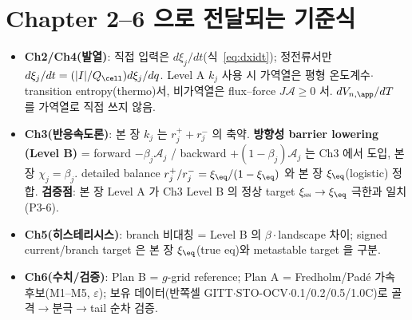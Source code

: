 \section{Chapter 2--6 으로 전달되는 기준식}\label{sec:transmit}
\begin{itemize}[leftmargin=1.4em]
\item \textbf{Ch2/Ch4(발열)}: 직접 입력은 $d\xi_j/dt$(식~\eqref{eq:dxidt}); 정전류서만
  $d\xi_j/dt=(|I|/Q_\cell)d\xi_j/dq$. Level A $k_j$ 사용 시 가역열은 평형 온도계수$\cdot$transition
  entropy(thermo)서, 비가역열은 flux--force $J\mathcal A\ge0$ 서. $dV_{n,\app}/dT$ 를 가역열로 직접 쓰지 않음.
\item \textbf{Ch3(반응속도론)}: 본 장 $k_j$ 는 $r_j^++r_j^-$ 의 축약. \textbf{방향성 barrier lowering
  (Level B)} = forward $-\beta_j\mathcal A_j$ / backward $+(1-\beta_j)\mathcal A_j$ 는 Ch3 에서 도입,
  본 장 $\chi_j=\beta_j$. detailed balance $r_j^+/r_j^-=\xi_\eq/(1-\xi_\eq)$ 와 본 장 $\xi_\eq$(logistic)
  정합. \textbf{검증점}: 본 장 Level A 가 Ch3 Level B 의 정상 target $\xi_\mathrm{ss}\to\xi_\eq$ 극한과
  일치(P3-6).
\item \textbf{Ch5(히스테리시스)}: branch 비대칭 = Level B 의 $\beta\cdot$landscape 차이; signed
  current/branch target 은 본 장 $\xi_\eq$(true eq)와 metastable target 을 구분.
\item \textbf{Ch6(수치/검증)}: Plan B = $g$-grid reference; Plan A = Fredholm/Pad\'e 가속 후보(M1--M5,
  $\varepsilon$); 보유 데이터(반쪽셀 GITT$\cdot$STO-OCV$\cdot$0.1/0.2/0.5/1.0C)로 골격$\to$분극$\to$tail
  순차 검증.
\end{itemize}

